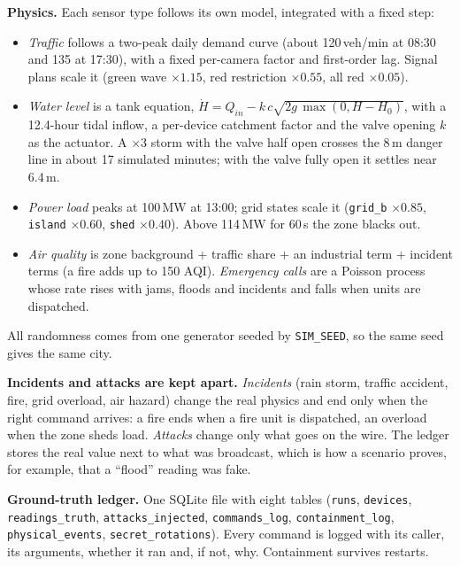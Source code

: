 \documentclass[10pt,a4paper]{article}
\begin{document}
\textbf{Physics.} Each sensor type follows its own model, integrated with a fixed step:
\begin{itemize}[leftmargin=*,itemsep=0pt,topsep=1pt]
  \item \textit{Traffic} follows a two-peak daily demand curve (about 120\,veh/min at 08:30 and 135 at 17:30), with a fixed per-camera factor and first-order lag. Signal plans scale it (green wave $\times1.15$, red restriction $\times0.55$, all red $\times0.05$).
  \item \textit{Water level} is a tank equation, $\dot H = Q_{in} - k\,c\sqrt{2g\,\max(0,H-H_0)}$, with a 12.4-hour tidal inflow, a per-device catchment factor and the valve opening $k$ as the actuator. A $\times3$ storm with the valve half open crosses the 8\,m danger line in about 17 simulated minutes; with the valve fully open it settles near 6.4\,m.
  \item \textit{Power load} peaks at 100\,MW at 13:00; grid states scale it (\texttt{grid\_b} $\times0.85$, \texttt{island} $\times0.60$, \texttt{shed} $\times0.40$). Above 114\,MW for 60\,s the zone blacks out.
  \item \textit{Air quality} is zone background + traffic share + an industrial term + incident terms (a fire adds up to 150 AQI). \textit{Emergency calls} are a Poisson process whose rate rises with jams, floods and incidents and falls when units are dispatched.
\end{itemize}
All randomness comes from one generator seeded by \texttt{SIM\_SEED}, so the same seed gives the same city.

\textbf{Incidents and attacks are kept apart.} \emph{Incidents} (rain storm, traffic accident, fire, grid overload, air hazard) change the real physics and end only when the right command arrives: a fire ends when a fire unit is dispatched, an overload when the zone sheds load. \emph{Attacks} change only what goes on the wire. The ledger stores the real value next to what was broadcast, which is how a scenario proves, for example, that a ``flood'' reading was fake.

\textbf{Ground-truth ledger.} One SQLite file with eight tables (\texttt{runs}, \texttt{devices}, \texttt{readings\_truth}, \texttt{attacks\_injected}, \texttt{commands\_log}, \texttt{containment\_log}, \texttt{physical\_events}, \texttt{secret\_rotations}). Every command is logged with its caller, its arguments, whether it ran and, if not, why. Containment survives restarts.
\end{document}
